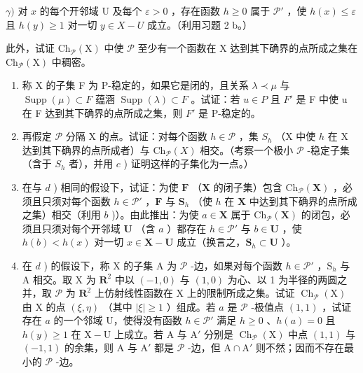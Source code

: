 \(\gamma)\) 对 \(x\) 的每个开邻域 U 及每个 \(\varepsilon > 0\) ，存在函数 \(h \geqslant 0\) 属于 \(\mathcal{P}'\) ，使 \(h(x) \leqslant \varepsilon\) 且 \(h(y) \geqslant 1\) 对一切 \(y \in X - U\) 成立。（利用习题 2 b。）

此外，试证 \(\mathrm{Ch}_{\mathcal{P}}(\mathrm{X})\) 中使 \(\mathcal{P}\) 至少有一个函数在 \(\mathrm{X}\) 达到其下确界的点所成之集在 \(\mathrm{Ch}_{\mathcal{P}}(\mathrm{X})\) 中稠密。

\begin{enumerate}
\def\labelenumi{\alph{enumi})}
\setcounter{enumi}{2}
\item
  称 X 的子集 F 为 P-稳定的，如果它是闭的，且关系 \(\lambda \prec \mu\) 与 \(\operatorname{Supp}(\mu) \subset F\) 蕴涵 \(\operatorname{Supp}(\lambda) \subset F\) 。试证：若 \(u \in P\) 且 \(F'\) 是 F 中使 u 在 F 达到其下确界的点所成之集，则 \(F'\) 是 P-稳定的。
\item
  再假定 \(\mathcal{P}\) 分隔 X 的点。试证：对每个函数 \(h \in \mathcal{P}\) ，集 \(S_h\) （X 中使 \(h\) 在 X 达到其下确界的点所成者）与 \(\mathrm{Ch}_{\mathcal{P}}(X)\) 相交。（考察一个极小 \(\mathcal{P}\) -稳定子集（含于 \(S_h\) 者），并用 \(c\) ) 证明这样的子集化为一点。）
\item
  在与 \(d\) ) 相同的假设下，试证：为使 \(\mathbf{F}\) （\(\mathbf{X}\) 的闭子集）包含 \(\mathrm{Ch}_{\mathcal{P}}(\mathbf{X})\) ，必须且只须对每个函数 \(h \in \mathcal{P}'\) ，\(\mathbf{F}\) 与 \(\mathbf{S}_h\) （使 \(h\) 在 \(\mathbf{X}\) 中达到其下确界的点所成之集）相交（利用 \(b\) )）。由此推出：为使 \(a \in \mathbf{X}\) 属于 \(\mathrm{Ch}_{\mathcal{P}}(\mathbf{X})\) 的闭包，必须且只须对每个开邻域 \(\mathbf{U}\) （含 \(a\) ）都存在 \(h \in \mathcal{P}'\) 与 \(b \in \mathbf{U}\) ，使 \(h(b) < h(x)\) 对一切 \(x \in \mathbf{X} - \mathbf{U}\) 成立（换言之，\(\mathbf{S}_h \subset \mathbf{U}\) ）。
\item
  在 \(d\) ) 的假设下，称 X 的子集 A 为 \(\mathcal{P}\) -边，如果对每个函数 \(h \in \mathcal{P}'\) ，\(\mathrm{S}_h\) 与 A 相交。取 X 为 \(\mathbf{R}^2\) 中以 \((-1,0)\) 与 \((1,0)\) 为心、以 1 为半径的两圆之并，取 \(\mathcal{P}\) 为 \(\mathbf{R}^2\) 上仿射线性函数在 X 上的限制所成之集。试证 \(\operatorname{Ch}_{\mathcal{P}}(\mathrm{X})\) 由 X 的点 \((\xi, \eta)\) （其中 \(|\xi| \geqslant 1\) ）组成。若 \(a\) 是 \(\mathcal{P}\) -极值点 \((1,1)\) ，试证存在 \(a\) 的一个邻域 U，使得没有函数 \(h \in \mathcal{P}'\) 满足 \(h \geqslant 0\) 、\(h(a) = 0\) 且 \(h(y) \geqslant 1\) 在 \(\mathrm{X} - \mathrm{U}\) 上成立。若 A 与 \(\mathrm{A}'\) 分别是 \(\operatorname{Ch}_{\mathcal{P}}(\mathrm{X})\) 中点 \((1,1)\) 与 \((-1,1)\) 的余集，则 A 与 \(\mathrm{A}'\) 都是 \(\mathcal{P}\) -边，但 \(\mathrm{A} \cap \mathrm{A}'\) 则不然；因而不存在最小的 \(\mathcal{P}\) -边。
\end{enumerate}

